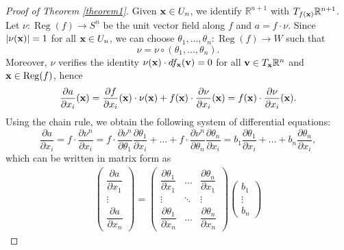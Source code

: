 \documentclass[10pt,a4paper]{amsart}
\DeclareMathOperator{\Reg}{Reg}
\newcommand{\mb}{\mathbb}
\begin{document}
\begin{proof}[Proof of Theorem \ref{theorem1}]
	Given ${\color{black}\bf x} \in U_n$, 
	we identify $\mb{R}^{n+1}$ with $T_{f({\color{black}\bf x})}
	\mb{R}^{n+1}$.
	Let $\nu\colon \Reg(f) \to S^n$ be the unit vector field along $f$ and $a=f\cdot \nu$.	
	Since $|\nu({\color{black}\bf x})|=1$ 
	for all ${\color{black}\bf x} \in U_n$, we can choose $\theta_1,\dots,\theta_n\colon \Reg(f) \to W$ such that
		\[\nu=\nu\circ (\theta_1,\dots,\theta_n).\]
	Moreover, $\nu$ verifies the identity $\nu({\color{black}\bf x})
	\cdot df_{\color{black}\bf x}({\color{black}\bf v})=0$ 
	for all ${\color{black}\bf v} \in T_{\color{black}\bf x}\mb{R}^n$ and 
	${\color{black}\bf x} \in \Reg(f)$, hence
		\[\frac{\partial a}{\partial x_i}({\color{black}\bf x})
		=\frac{\partial f}{\partial x_i}({\color{black}\bf x})
		\cdot \nu({\color{black}\bf x})+f({\color{black}\bf x})
		\cdot \frac{\partial \nu}{\partial x_i}({\color{black}\bf x})
		=f({\color{black}\bf x})\cdot 
		\frac{\partial \nu}{\partial x_i}({\color{black}\bf x}).\]
	Using the chain rule, we obtain the following system of differential equations:
	\[
		\frac{\partial a}{\partial x_i}=f\cdot \frac{\partial \nu^n}{\partial x_i}
		=f\cdot \frac{\partial \nu^n}{\partial \theta_1}\frac{\partial \theta_1}{\partial x_i}+\dots+f\cdot 	\frac{\partial \nu^n}{\partial \theta_n}\frac{\partial \theta_n}{\partial x_i}=b_1\frac{\partial \theta_1}{\partial x_i}+\dots+b_n\frac{\partial \theta_n}{\partial x_i},
	\]
	which can be written in matrix form as
	\begin{align}\label{system b1 bn}
		\begin{pmatrix}
			\dfrac{\partial a}{\partial x_1} \\ \vdots \\ \dfrac{\partial a}{\partial x_n}	
		\end{pmatrix}
		=
		\begin{pmatrix}
			\dfrac{\partial \theta_1}{\partial x_1} & \hdots & \dfrac{\partial \theta_n}{\partial x_1}	\\
			\vdots				& \ddots & \vdots				\\
			\dfrac{\partial \theta_1}{\partial x_n} & \hdots & \dfrac{\partial \theta_n}{\partial x_n}
		\end{pmatrix}
		\begin{pmatrix}
			b_1 \\ \vdots \\ b_n
		\end{pmatrix}
	\end{align}


\end{proof}
\end{document}
